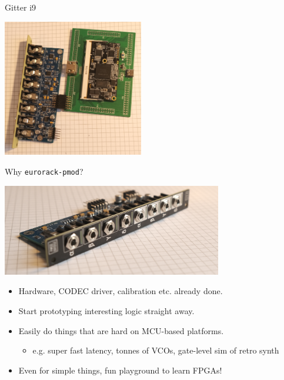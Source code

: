 \documentclass{beamer}
\begin{document}
\begin{frame}{Gitter i9}

\begin{center}
    \includegraphics[height=6cm]{img/gitter_i9.png}
\end{center}

\end{frame}

\begin{frame}{Why \texttt{eurorack-pmod}?}

    \begin{center}
        \includegraphics[height=4cm]{img/frontconndof.png}
    \end{center}

    \begin{itemize}
        \item Hardware, CODEC driver, calibration etc. already done.
        \item Start prototyping interesting logic straight away.
        \item Easily do things that are hard on MCU-based platforms.
            \begin{itemize}
                \item e.g. super fast latency, tonnes of VCOs, gate-level sim of retro synth
            \end{itemize}
        \item Even for simple things, fun playground to learn FPGAs!
    \end{itemize}

\end{frame}
\end{document}
